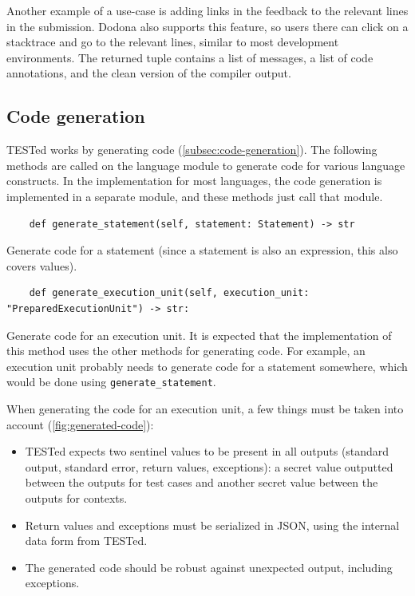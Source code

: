 \documentclass[../main]{subfiles}
\begin{document}
Another example of a use-case is adding links in the feedback to the relevant lines in the submission.
Dodona also supports this feature, so users there can click on a stacktrace and go to the relevant lines, similar to most development environments.
The returned tuple contains a list of messages, a list of code annotations, and the clean version of the compiler output.

\subsection{Code generation}\label{subsec:code-generation2}

TESTed works by generating code (\cref{subsec:code-generation}).
The following methods are called on the language module to generate code for various language constructs.
In the implementation for most languages, the code generation is implemented in a separate module, and these methods just call that module.

\begin{verbatim}
    def generate_statement(self, statement: Statement) -> str
\end{verbatim}

Generate code for a statement (since a statement is also an expression, this also covers values).

\begin{verbatim}
    def generate_execution_unit(self, execution_unit: "PreparedExecutionUnit") -> str:
\end{verbatim}

Generate code for an execution unit.
It is expected that the implementation of this method uses the other methods for generating code.
For example, an execution unit probably needs to generate code for a statement somewhere, which would be done using \texttt{generate_statement}.

When generating the code for an execution unit, a few things must be taken into account (\cref{fig:generated-code}):

\begin{itemize}
    \item TESTed expects two sentinel values to be present in all outputs (standard output, standard error, return values, exceptions): a secret value outputted between the outputs for test cases and another secret value between the outputs for contexts.
    \item Return values and exceptions must be serialized in JSON, using the internal data form from TESTed.
    \item The generated code should be robust against unexpected output, including exceptions.
\end{itemize}
\end{document}
